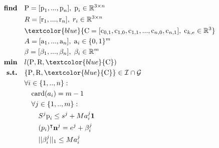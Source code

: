 \begin{align}
    \textrm{\textbf{find}}  \quad & \mbox{P}=[\mbox{p}_1,...,\mbox{p}_n], \; \mbox{p}_i \in \mathbb{R}^{3 \times n} \nonumber\\
                            \quad & R=[\mbox{r}_1,...,\mbox{r}_n], \; r_i \in \mathbb{R}^{3 \times n} \nonumber\\
                            \quad & \textcolor{blue}{\mbox{C}=[\mbox{c}_{0,1},\mbox{c}_{1,0},\mbox{c}_{1,1},...,\mbox{c}_{n,0},\mbox{c}_{n,1}], \; \mbox{c}_{k,e} \in \mathbb{R}^3} \nonumber\\
                            \quad & A=[\mbox{a}_1,...,\mbox{a}_n], \; \mbox{a}_i \in \{0,1\}^{m} \nonumber\\
                            \quad & \beta=[\beta_1,...,\beta_n], \; \beta_i \in \mathbb{R}^{m} \nonumber\\
    \textrm{\textbf{min}}  \quad & l(\mbox{P},\mbox{R},\textcolor{blue}{\mbox{C}}) \nonumber\\
    \textrm{\textbf{s.t.}}  \quad & \{\mbox{P},\mbox{R},\textcolor{blue}{\mbox{C}}\} \in \mathcal{I} \cap \mathcal{G} \nonumber\\
                            \quad & \forall i \in \{1,..,n\} : \nonumber\\
                                \quad & \quad \mbox{card}(a_i) = m-1  \nonumber\\
                                \quad & \quad \forall j \in \{1,..,m\} : \nonumber\\
                                    \quad & \quad \quad S^j \mbox{p}_i \leq s^j + M a_i^j \textbf{1} \nonumber\\
                                    \quad & \quad \quad (p_i)^{\intercal} \textbf{n}^j = e^j + \beta_i^j \nonumber\\
                                    \quad & \quad \quad ||\beta_i^j||_1 \leq M a_i^j \nonumber\\

\end{align}

